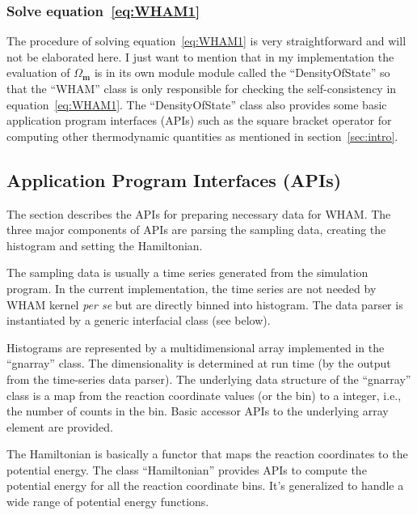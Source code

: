 \subsubsection{Solve equation~\ref{eq:WHAM1}}
The procedure of solving equation~\ref{eq:WHAM1} is very straightforward and
will not be elaborated here. I just want to mention that in my implementation
the evaluation of $\Omega_{\mathbf{m}}$ is in its own module module called the
``DensityOfState'' so that the ``WHAM'' class is only responsible for checking
the self-consistency in equation~\ref{eq:WHAM1}.  The ``DensityOfState'' class
also provides some basic application program interfaces (APIs) such as the
square bracket operator for computing other thermodynamic quantities as
mentioned in section~\ref{sec:intro}.

\subsection{Application Program Interfaces (APIs)}
The section describes the APIs for preparing necessary data for WHAM. The three
major components of APIs are parsing the sampling data, creating the histogram 
and setting the Hamiltonian.

The sampling data is usually a time series generated from the simulation
program. In the current implementation, the time series are not needed by WHAM
kernel \textit{per se} but are directly binned into histogram. The data parser 
is instantiated by a generic interfacial class (see below). 

Histograms are represented by a multidimensional array implemented in the
``gnarray'' class. The dimensionality is determined at run time (by the output 
from the time-series data parser). The underlying data structure of the 
``gnarray'' class is a map from the reaction coordinate values (or the bin)
to a integer, i.e., the number of counts in the bin. Basic accessor APIs
to the underlying array element are provided.

The Hamiltonian is basically a functor that maps the reaction coordinates 
to the potential energy. The class ``Hamiltonian'' provides APIs to 
compute the potential energy for all the reaction coordinate bins. It's 
generalized to handle a wide range of potential energy functions.

